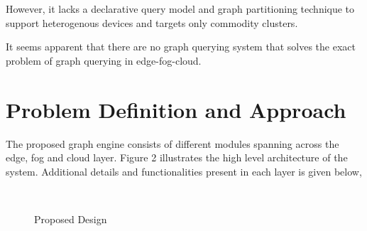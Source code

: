 \documentclass[conference]{IEEEtran}
\begin{document}
However, it lacks a declarative query model and graph partitioning technique to support heterogenous devices and targets only commodity clusters.

It seems apparent that there are no graph querying system that solves the exact problem of graph querying in edge-fog-cloud. 

\section{Problem Definition and Approach}

The proposed graph engine consists of different modules spanning across the edge, fog and cloud layer. Figure 2 illustrates the high level architecture of the system. Additional details and functionalities present in each layer is given below,

\begin{figure}[th]
	\centering%
	\qquad
	\\
	\label{fig:problem-approach}
	\caption{Proposed Design}
	\vspace{-0.1in}
\end{figure} 
\end{document}
